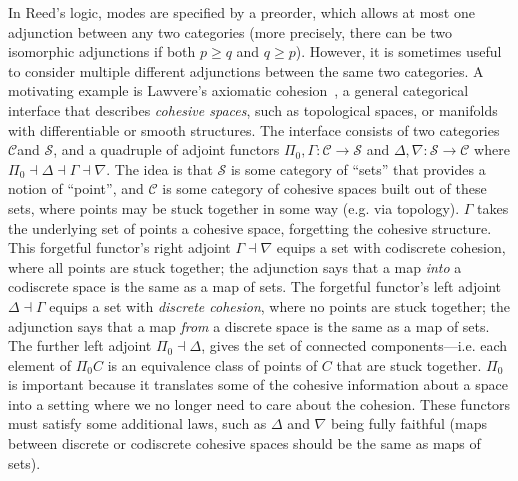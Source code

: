 \documentclass{drl-common/llncs}
\newcommand{\C}{\ensuremath{\mathcal{C}}}
\newcommand{\la}{\ensuremath{\dashv}}
\begin{document}
In Reed's logic, modes are specified by a preorder, which allows at most
one adjunction between any two categories (more precisely, there can be
two isomorphic adjunctions if both $p \ge q$ and $q \ge p$).  However,
it is sometimes useful to consider multiple different adjunctions
between the same two categories.  A motivating example is Lawvere's
axiomatic cohesion~\citep{lawvere07cohesion}, a general categorical
interface that describes \emph{cohesive spaces}, such as topological
spaces, or manifolds with differentiable or smooth structures.  The
interface consists of two categories \C and $\mathcal{S}$, and a
quadruple of adjoint functors $\Pi_0,\Gamma : \mathcal{C} \to
\mathcal{S}$ and $\Delta,\nabla : \mathcal{S} \to \mathcal{C}$ where
$\Pi_0 \la \Delta \la \Gamma \la \nabla$.  The idea is that
$\mathcal{S}$ is some category of ``sets'' that provides a notion of
``point'', and \C\/ is some category of cohesive spaces built out of
these sets, where points may be stuck together in some way (e.g. via
topology).  $\Gamma$ takes the underlying set of points a cohesive
space, forgetting the cohesive structure.  This forgetful functor's
right adjoint $\Gamma \la \nabla$ equips a set with codiscrete cohesion,
where all points are stuck together; the adjunction says that a map
\emph{into} a codiscrete space is the same as a map of sets.  The
forgetful functor's left adjoint $\Delta \la \Gamma$ equips a set with
\emph{discrete cohesion}, where no points are stuck together; the
adjunction says that a map \emph{from} a discrete space is the same as a
map of sets.  The further left adjoint $\Pi_0 \la \Delta$, gives the set
of connected components---i.e. each element of $\Pi_0 C$ is an
equivalence class of points of $C$ that are stuck together.  $\Pi_0$ is
important because it translates some of the cohesive information about a
space into a setting where we no longer need to care about the cohesion.
These functors must satisfy some additional laws, such as $\Delta$ and
$\nabla$ being fully faithful (maps between discrete or codiscrete
cohesive spaces should be the same as maps of sets).
\end{document}
